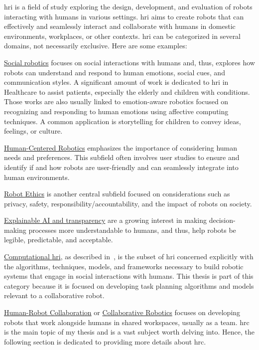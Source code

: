 \acrfull{hri} is a field of study exploring the design, development, and evaluation of robots interacting with humans in various settings. \acrshort{hri} aims to create robots that can effectively and seamlessly interact and collaborate with humans in domestic environments, workplaces, or other contexts. 
\acrshort{hri} can be categorized in several domains, not necessarily exclusive. Here are some examples:

\uline{Social robotics} focuses on social interactions with humans and, thus, explores how robots can understand and respond to human emotions, social cues, and communication styles.
A significant amount of work is dedicated to \acrshort{hri} in Healthcare to assist patients, especially the elderly and children with conditions. Those works are also usually linked to emotion-aware robotics focused on recognizing and responding to human emotions using affective computing techniques. A common application is storytelling for children to convey ideas, feelings, or culture. 

\uline{Human-Centered Robotics} emphasizes the importance of considering human needs and preferences. This subfield often involves user studies to ensure and identify if and how robots are user-friendly and can seamlessly integrate into human environments.

\uline{Robot Ethics} is another central subfield focused on considerations such as privacy, safety, responsibility/accountability, and the impact of robots on society.

\uline{Explainable AI and transparency} are a growing interest in making decision-making processes more understandable to humans, and thus, help robots be legible, predictable, and acceptable.

\uline{Computational \acrshort{hri}}, as described in~\cite{thomaz_computational_2016}, is the subset of \acrshort{hri} concerned explicitly with the algorithms, techniques, models, and frameworks necessary to build robotic systems that engage in social interactions with humans. This thesis is part of this category because it is focused on developing task planning algorithms and models relevant to a collaborative robot. 

\uline{Human-Robot Collaboration} or \uline{Collaborative Robotics} focuses on developing robots that work alongside humans in shared workspaces, usually as a team. \acrshort{hrc} is the main topic of my thesis and is a vast subject worth delving into. Hence, the following section is dedicated to providing more details about \acrshort{hrc}.

